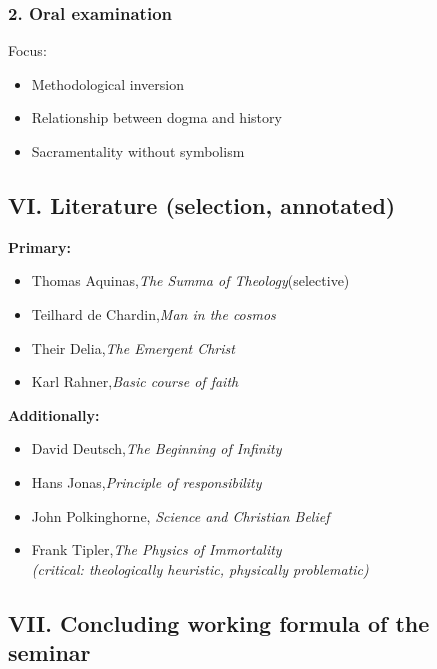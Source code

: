 \documentclass[
]{article}
\begin{document}
\subsubsection{\texorpdfstring{\textbf{2. Oral examination}}{2. Oral examination}}\label{oral-examination}

Focus:

\begin{itemize}
\item
  Methodological inversion
\item
  Relationship between dogma and history
\item
  Sacramentality without symbolism
\end{itemize}

\subsection{\texorpdfstring{\textbf{VI. Literature (selection, annotated)}}{VI. Literature (selection, annotated)}}\label{vi.-literature-selection-annotated}

\textbf{Primary:}

\begin{itemize}
\item
  Thomas Aquinas,\emph{The Summa of Theology}(selective)
\item
  Teilhard de Chardin,\emph{Man in the cosmos}
\item
  Their Delia,\emph{The Emergent Christ}
\item
  Karl Rahner,\emph{Basic course of faith}
\end{itemize}

\textbf{Additionally:}

\begin{itemize}
\item
  David Deutsch,\emph{The Beginning of Infinity}
\item
  Hans Jonas,\emph{Principle of responsibility}
\item
  John Polkinghorne, \emph{Science and Christian Belief}
\item
  Frank Tipler,\emph{The Physics of Immortality\\
  (critical: theologically heuristic, physically problematic)}
\end{itemize}

\subsection{\texorpdfstring{\textbf{VII. Concluding working formula of the seminar}}{VII. Concluding working formula of the seminar}}\label{vii.-concluding-working-formula-of-the-seminar}
\end{document}
